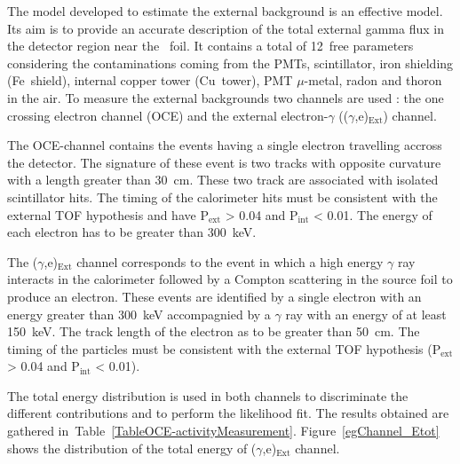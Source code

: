 \documentclass[main.tex]{subfiles}
\begin{document}
\bigskip


\NI The model developed to estimate the external background is an effective model. Its aim is to provide an accurate description of the total external gamma flux in the detector region near the \Cd~foil. It contains a total of 12~free parameters considering the contaminations coming from the PMTs, scintillator, iron shielding (Fe~shield), internal copper tower (Cu~tower), PMT $\mu$-metal, radon and thoron in the air. To measure the external backgrounds two channels are used : the one crossing electron channel (OCE) and the external electron-$\gamma$ (($\gamma$,e)$_{\text{Ext}}$) channel.


\bigskip


\NI The OCE-channel contains the events having a single electron travelling accross the detector. The signature of these event is two tracks with opposite curvature with a length greater than 30~cm. These two track are associated with isolated scintillator hits. The timing of the calorimeter hits must be consistent with the external TOF hypothesis and have P$_{\text{ext}}$ > 0.04 and P$_{\text{int}}$ < 0.01. The energy of each electron has to be greater than 300~keV.


\bigskip


\NI The ($\gamma$,e)$_{\text{Ext}}$ channel corresponds to the event in which a high energy $\gamma$ ray interacts in the calorimeter followed by a Compton scattering in the source foil to produce an electron. These events are identified by a single electron with an energy greater than 300~keV accompagnied by a $\gamma$ ray with an energy of at least 150~keV. The track length of the electron as to be greater than 50~cm. The timing of the particles must be consistent with the external TOF hypothesis (P$_{\text{ext}}$ > 0.04 and P$_{\text{int}}$ < 0.01).


\bigskip


\NI The total energy distribution is used in both channels to discriminate the different contributions and to perform the likelihood fit. The results obtained are gathered in~Table~\ref{TableOCE-activityMeasurement}. Figure~\ref{egChannel_Etot} shows the distribution of the total energy of ($\gamma$,e)$_{\text{Ext}}$ channel.
\end{document}
